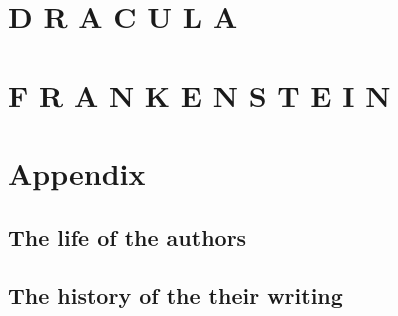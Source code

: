 
\part{D R A C U L A}





\newpage %



\part{F R A N K E N S T E I N}









\newpage %


\part{Appendix}
\appendix
\chapter{The life of the authors}

\chapter{The history of the their writing}

